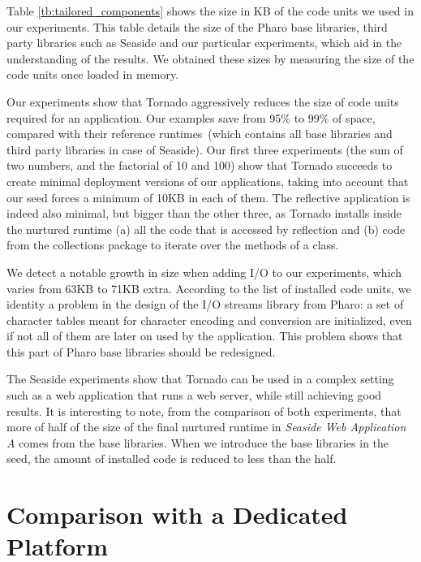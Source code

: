Table \ref{tb:tailored_components} shows the size in KB of the code units we used in our experiments. This table details the size of the Pharo base libraries, third party libraries such as Seaside and our particular experiments, which aid in the understanding of the results. We obtained these sizes by measuring the size of the code units once loaded in memory.

Our experiments show that Tornado aggressively reduces the size of code units required for an application. Our examples save from 95\% to 99\% of space, compared with their reference runtimes~(which contains all base libraries and third party libraries in case of Seaside). Our first three experiments (the sum of two numbers, and the factorial of 10 and 100) show that Tornado succeeds to create minimal deployment versions of our applications, taking into account that our seed forces a minimum of 10KB in each of them. The reflective application is indeed also minimal, but bigger than the other three, as Tornado installs inside the nurtured runtime (a) all the code that is accessed by reflection and (b) code from the collections package to iterate over the methods of a class.

We detect a notable growth in size when adding I/O to our experiments, which varies from 63KB to 71KB extra. According to the list of installed code units, we identity a problem in the design of the I/O streams library from Pharo: a set of character tables meant for character encoding and conversion are initialized, even if not all of them are later on used by the application. This problem shows that this part of Pharo base libraries should be redesigned.

The Seaside experiments show that Tornado can be used in a complex setting such as a web application that runs a web server, while still achieving good results. It is interesting to note, from the comparison of both experiments, that more of half of the size of the final nurtured runtime in \emph{Seaside Web Application A} comes from the base libraries. When we introduce the base libraries in the seed, the amount of installed code is reduced to less than the half.

\section{Comparison with a Dedicated Platform}

